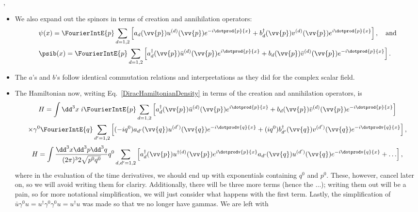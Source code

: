 \sep

\begin{itemize}
    \item We also expand out the spinors in terms of creation and annihilation operators:
        \begin{align}
            &\psi(x) = \FourierIntE{p} \sum_{d=1,2} \left[ a_d(\vv{p})u^{(d)}(\vv{p})e^{-i\dotprod{p}{x}} + b_d^{\dagger}(\vv{p})v^{(d)}(\vv{p})e^{i\dotprod{p}{x}} \right], \quad \mathrm{and} \\
            &\psib(x) = \FourierIntE{p} \sum_{d=1,2} \left[ a^{\dagger}_d(\vv{p})\bar{u}^{(d)}(\vv{p})e^{i\dotprod{p}{x}} + b_d(\vv{p})\bar{v}^{(d)}(\vv{p})e^{-i\dotprod{p}{x}} \right].\label{DiracSpinorFourierExpan}
        \end{align}
    \item The $a$'s and $b$'s follow identical commutation relations and interpretations as they did for the complex scalar field.
    \item The Hamiltonian now, writing Eq.~\eqref{DiracHamiltonianDensity} in terms of the creation and annihilation operators, is
        \begin{multline*}
            H = \int\dd^3x\; i\FourierIntE{p} \sum_{d=1,2} \left[ a^{\dagger}_d(\vv{p})\bar{u}^{(d)}(\vv{p})e^{i\dotprod{p}{x}} + b_d(\vv{p})\bar{v}^{(d)}(\vv{p})e^{-i\dotprod{p}{x}} \right] \\ 
            \times \gamma^0 \FourierIntE{q} \sum_{d'=1,2} \left[ (-iq^0)a_{d'}(\vv{q})u^{(d')}(\vv{q})e^{-i\dotprodv{q}{x}} + (iq^0) b^{\dagger}_{d'}(\vv{q})v^{(d')}(\vv{q})e^{-i\dotprodv{q}{x}} \right],
        \end{multline*}
        \begin{equation*}
            H = \int\frac{\dd^3x\dd^3p\dd^3q}{(2\pi)^3 2\sqrt{p^0q^0}} q^0 \sum_{d,d'=1,2} \left[ a_d^{\dagger}(\vv{p})u^{\dagger(d)}(\vv{p})e^{i\dotprodv{p}{x}}a_{d'}(\vv{q})u^{(d')}(\vv{q})e^{-i\dotprodv{q}{x}} + \ldots \right],
        \end{equation*}
        where in the evaluation of the time derivatives, we should end up with exponentials containing $q^0$ and $p^0$. These, however, cancel later on, so we will avoid writing them for clariry. Additionally, there will be three more terms (hence the $\ldots$); writing them out will be a pain, so for more notational simplification, we will just consider what happens with the first term. Lastly, the simplification of $\bar{u}\gamma^0u = u^{\dagger}\gamma^0\gamma^0u = u^{\dagger}u$ was made so that we no longer have gammas. We are left with

\end{itemize}
